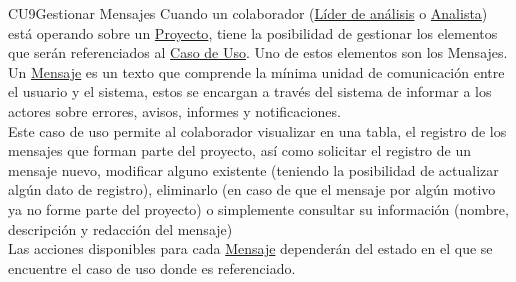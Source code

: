 	\begin{UseCase}{CU9}{Gestionar Mensajes}{
		Cuando un colaborador (\hyperlink{jefe}{Líder de análisis} o \hyperlink{analista}{Analista}) está operando sobre un \hyperlink{proyectoEntidad}{Proyecto}, tiene la posibilidad de gestionar los elementos que serán referenciados al \hyperlink{casoUso}{Caso de Uso}. Uno de estos elementos son los Mensajes.\\
		
		Un \hyperlink{MSGEntidad}{Mensaje} es un texto que comprende la mínima unidad de comunicación entre el usuario y el sistema, estos se encargan a través del sistema de informar a los actores sobre errores, avisos, informes y notificaciones.\\
		
		Este caso de uso permite al colaborador visualizar en una tabla, el registro de los mensajes que forman parte del proyecto, así como solicitar el registro de un mensaje nuevo, modificar alguno existente (teniendo la posibilidad de actualizar algún dato de registro), eliminarlo (en caso de que el mensaje por algún motivo ya no forme parte del proyecto) o simplemente consultar su información (nombre, descripción y redacción del mensaje) \\
		Las acciones disponibles para cada \hyperlink{MSGEntidad}{Mensaje} dependerán del estado en el que se encuentre el caso de uso donde es referenciado. 
	}

	
\end{UseCase}
